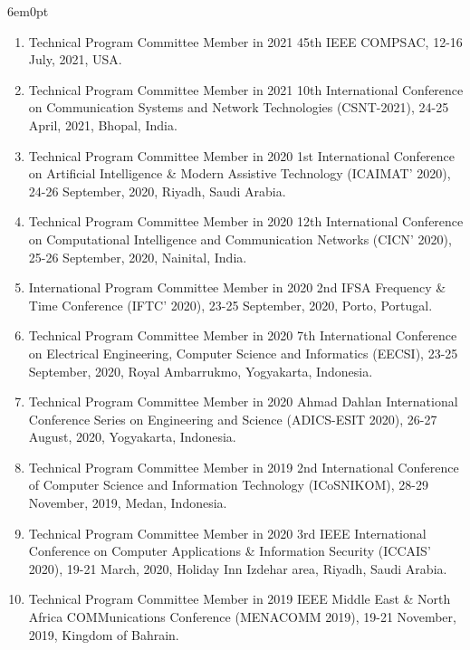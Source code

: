 \documentclass[11pt,a4paper]{moderncv}
\begin{document}
\begin{adjustwidth}{6em}{0pt}
\begin{enumerate}
		\item Technical Program Committee Member in 2021 45th IEEE COMPSAC, 12-16 July, 2021, USA.
		
		\item Technical Program Committee Member in 2021 10th International Conference on Communication Systems and Network Technologies (CSNT-2021), 24-25 April, 2021, Bhopal, India.
		
		\item Technical Program Committee Member in 2020 1st International Conference on Artificial Intelligence \& Modern Assistive Technology (ICAIMAT’ 2020), 24-26 September, 2020, Riyadh, Saudi Arabia.
		
		\item Technical Program Committee Member in 2020 12th International Conference on Computational Intelligence and Communication Networks (CICN' 2020), 25-26 September, 2020, Nainital, India.
		
		\item International Program Committee Member in 2020 2nd IFSA Frequency \& Time Conference (IFTC' 2020), 23-25 September, 2020, Porto, Portugal.
		
		\item Technical Program Committee Member in 2020 7th International Conference on Electrical Engineering, Computer Science and Informatics (EECSI), 23-25 September, 2020, Royal Ambarrukmo, Yogyakarta, Indonesia.
		
		\item Technical Program Committee Member in 2020 Ahmad Dahlan International Conference Series on Engineering and Science (ADICS-ESIT 2020), 26-27 August, 2020, Yogyakarta, Indonesia.
		
		\item Technical Program Committee Member in 2019 2nd International Conference of Computer Science and Information Technology (ICoSNIKOM), 28-29 November, 2019, Medan, Indonesia.
		
		\item Technical Program Committee Member in 2020 3rd IEEE International Conference on Computer Applications \& Information Security (ICCAIS’ 2020), 19-21 March, 2020, Holiday Inn Izdehar area, Riyadh, Saudi Arabia.
		
		\item Technical Program Committee Member in 2019 IEEE Middle East \& North Africa COMMunications Conference (MENACOMM 2019), 19-21 November, 2019, Kingdom of Bahrain.
		

\end{enumerate}
\end{adjustwidth}
\end{document}
